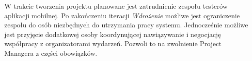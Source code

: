 W trakcie tworzenia projektu planowane jest zatrudnienie zespołu testerów
aplikacji mobilnej. Po zakończeniu iteracji \emph{Wdrożenie} możliwe jest
ograniczenie zespołu do osób niezbędnych do utrzymania pracy systemu.
Jednocześnie możliwe jest przyjęcie dodatkowej osoby koordynującej nawiązywanie
i negocjację współpracy z organizatorami wydarzeń. Pozwoli to na zwolnienie
Project Managera z części obowiązków.
